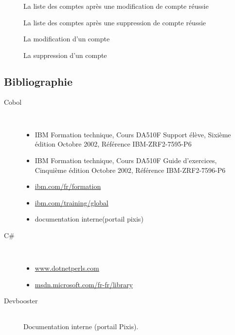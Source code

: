 \documentclass[a4paper,french,12pt]{article}
\begin{document}
		\begin{figure}[h!]
			\caption{La liste des comptes après une modification de compte réussie}
			\centering
		\end{figure} 
		\clearpage
		\begin{figure}[h!]
			\caption{La liste des comptes après une suppression de compte réussie}
			\centering
		\end{figure} 
		
		\begin{figure}[h!]
			\caption{La modification d'un compte}
			\centering
		\end{figure} 
		
		\begin{figure}[h!]
			\caption{La suppression d'un compte}
			\centering
		\end{figure} 
	
	
	
	\subsection{Bibliographie}
	
		\begin{description}		
				\item[Cobol] \hfill \\
					\begin{itemize}
						\item IBM Formation technique, Cours DA510F Support élève, Sixième édition Octobre 2002, Référence IBM-ZRF2-7595-P6
						\item IBM Formation technique, Cours DA510F Guide d'exercices, Cinquième édition Octobre 2002, Référence IBM-ZRF2-7596-P6
						\item \url{ibm.com/fr/formation}
						\item \url{ibm.com/training/global}
						\item documentation interne(portail pixis)
					\end{itemize}
					
				\item[C\#] \hfill \\
					\begin{itemize}
						\item \url{www.dotnetperls.com}
						\item \url{msdn.microsoft.com/fr-fr/library}
					\end{itemize}

				\item[Devbooster] \hfill \\
					Documentation interne (portail Pixis).
		\end{description}
\end{document}
